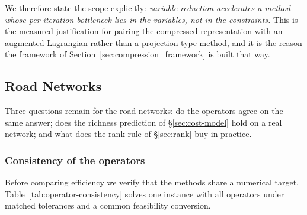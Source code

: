 \documentclass[11pt]{article}
\newif\ifshownotes \shownotesfalse
\newcommand{\conote}[1]{\ifshownotes{\color{red}\small\textsf{[Note to co-authors: #1]}}\fi}
\begin{document}
We therefore state the scope explicitly: \emph{variable reduction accelerates a method whose
per-iteration bottleneck lies in the variables, not in the constraints.} This is the
measured justification for pairing the compressed representation with an augmented Lagrangian
rather than a projection-type method, and it is the reason the framework of
Section~\ref{sec:compression_framework} is built that way.

\conote{Referee~2 wrote that ``the augmented Lagrangian method is quite standard'' and wanted
a tailored algorithm. This subsection is our answer: not a new algorithm, but a demonstration
that the pairing is forced. Whether that satisfies him is the main uncertainty in the
revision. He also asked for comparison against state-of-the-art path-based methods; we compare
four operators but no bush-based method (Algorithm~B, OBA, iTAPAS). Do we add one, or argue
the comparison is out of scope?}


\subsection{Road Networks}
\label{sec:road-networks}


Three questions remain for the road networks: do the operators agree on the same answer; does
the richness prediction of \S\ref{sec:cost-model} hold on a real network; and what does the
rank rule of \S\ref{sec:rank} buy in practice.


\subsubsection*{Consistency of the operators}


Before comparing efficiency we verify that the methods share a numerical target.
Table~\ref{tab:operator-consistency} solves one instance with all operators under matched
tolerances and a common feasibility conversion.
\end{document}
